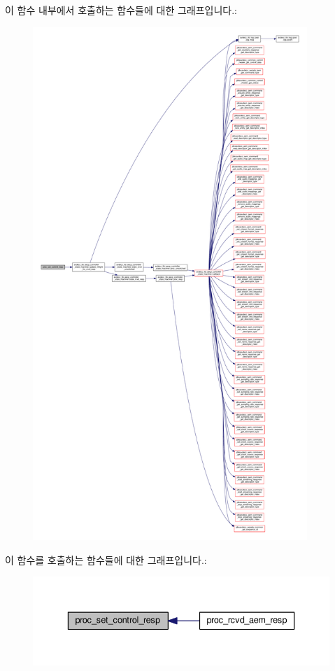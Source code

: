 이 함수 내부에서 호출하는 함수들에 대한 그래프입니다.\+:
\nopagebreak
\begin{figure}[H]
\begin{center}
\leavevmode
\includegraphics[height=550pt]{classavdecc__lib_1_1end__station__imp_a5ec590aa701ab1dc91e3ef47df951d90_cgraph}
\end{center}
\end{figure}




이 함수를 호출하는 함수들에 대한 그래프입니다.\+:
\nopagebreak
\begin{figure}[H]
\begin{center}
\leavevmode
\includegraphics[width=336pt]{classavdecc__lib_1_1end__station__imp_a5ec590aa701ab1dc91e3ef47df951d90_icgraph}
\end{center}
\end{figure}


